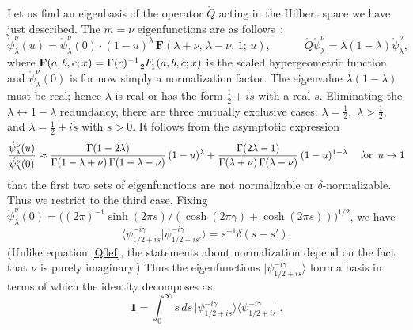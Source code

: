 \documentclass[11pt]{article}
\newcommand{\hgf}{%
\,\tensor[_{2\kern-1.2pt}]{F}{_{\kern-0.8pt 1}}\kern-1.2pt}
\newcommand{\hgfs}{\mathbf{F}}
\newcommand{\blangle}{\bigl\langle}
\newcommand{\brangle}{\bigr\rangle}
\newcommand*{\bbra}[1]{\blangle{#1}\big|}
\newcommand*{\bket}[1]{\big|{#1}\brangle}
\newcommand*{\bbraket}[2]{\blangle{#1}\big|{#2}\brangle}
\newcommand{\unit}{\mathbf{1}}
\newcommand{\rpsi}{\mathring{\psi}}
\newcommand{\rQ}{\mathring{Q}}
\newcommand{\lam}{\lambda}
\newcommand{\ga}{\gamma}
\newcommand{\ov}{\over}
\begin{document}
Let us find an eigenbasis of the operator $\rQ$ acting in the Hilbert space we have just described. The $m=\nu$ eigenfunctions are as follows~\cite{SL2R}:
\begin{equation} \label{Eucpsi}
\rpsi^{\nu}_{\lambda}(u)=\rpsi^{\nu}_{\lambda}(0)\cdot
(1-u)^\lambda\,\hgfs(\lambda+\nu,\,\lambda-\nu,\,1;\,u),
\qquad\quad
\rQ\rpsi^{\nu}_{\lambda}=\lambda(1-\lambda)\rpsi^{\nu}_{\lambda},
\end{equation}
where $\hgfs(a,b,c;x)=\Gamma(c)^{-1}\hgf(a,b,c;x)$ is the scaled hypergeometric function and $\rpsi^{\nu}_{\lam}(0)$ is for now simply a normalization factor. The eigenvalue $\lambda(1-\lambda)$ must be real; hence $\lambda$ is real or has the form $\frac{1}{2}+is$ with a real $s$. Eliminating the $\lambda\leftrightarrow 1-\lambda$ redundancy, there are three mutually exclusive cases: $\lambda=\frac{1}{2}$,\, $\lambda>\frac{1}{2}$, and $\lambda=\frac{1}{2}+is$ with $s>0$. It follows from the asymptotic expression
\begin{equation}\label{Q0ef}
{\rpsi^{\nu}_{\lambda}(u) \ov \rpsi^{\nu}_{\lambda}(0)}\approx
\frac{\Gamma(1-2\lambda)}{\Gamma(1-\lambda+\nu)\,\Gamma(1-\lambda-\nu)}\,
(1-u)^{\lambda}
+\frac{\Gamma(2\lambda-1)}{\Gamma(\lambda+\nu)\,\Gamma(\lambda-\nu)}\,
(1-u)^{1-\lambda}\quad\:
\text{for }\, u\to 1
\end{equation}
that the first two sets of eigenfunctions are not normalizable or $\delta$-normalizable. Thus we restrict to the third case. Fixing $\rpsi^{\nu}_{\lambda}(0)=\bigl((2\pi)^{-1}\sinh(2\pi s)/(\cosh(2\pi\ga) + \cosh(2\pi s))\bigr)^{1/2}$, we have
\begin{equation}
\bbraket{\psi^{-i\gamma}_{1/2+is}}{\psi^{-i\gamma}_{1/2+is'}} 
=s^{-1}\delta(s-s').
\end{equation}
(Unlike equation \eqref{Q0ef}, the statements about normalization depend on the fact that $\nu$ is purely imaginary.) Thus the eigenfunctions $\bket{\psi^{-i\gamma}_{1/2+is}}$ form a basis in terms of which the identity decomposes as
\begin{equation}\label{decid0}
\unit=\int_{0}^{\infty}s\,ds\, \bket{\psi^{-i\gamma}_{1/2+is}}\bbra{\psi^{-i\gamma}_{1/2+is}}.
\end{equation}
\end{document}
